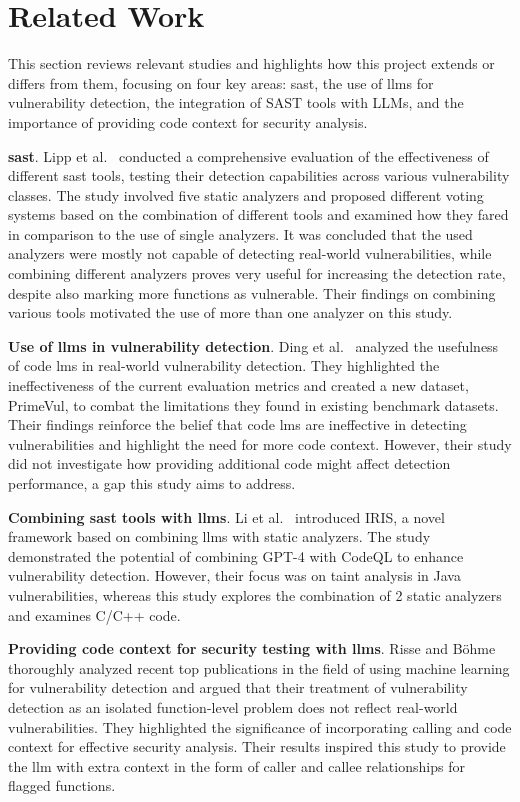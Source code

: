 \section{Related Work}
\label{sec:relwork}
This section reviews relevant studies and highlights how this project extends or differs from them, focusing on four key areas: \acl{sast}, the use of \acp{llm} for vulnerability detection, the integration of SAST tools with LLMs, and the importance of providing code context for security analysis.

\textbf{\Acl{sast}}. 
Lipp et al.~\cite{10.1145/3533767.3534380} conducted a comprehensive evaluation of the effectiveness of different \ac{sast} tools, testing their detection capabilities across various vulnerability classes. 
The study involved five static analyzers and proposed different voting systems based on the combination of different tools and examined how they fared in comparison to the use of single analyzers. 
It was concluded that the used analyzers were mostly not capable of detecting real-world vulnerabilities, while combining different analyzers proves very useful for increasing the detection rate, despite also marking more functions as vulnerable. 
Their findings on combining various tools motivated the use of more than one analyzer on this study.

\textbf{Use of \acp{llm} in vulnerability detection}. 
Ding et al.~\cite{ding2024vulnerabilitydetectioncodelanguage} analyzed the usefulness of code \acp{lm} in real-world vulnerability detection. 
They highlighted the ineffectiveness of the current evaluation metrics and created a new dataset, PrimeVul, to combat the limitations they found in existing benchmark datasets. 
Their findings reinforce the belief that code \acp{lm} are ineffective in detecting vulnerabilities and highlight the need for more code context.
However, their study did not investigate how providing additional code might affect detection performance, a gap this study aims to address.

\textbf{Combining \ac{sast} tools with \acp{llm}}.
Li et al.~\cite{li2024llmassistedstaticanalysisdetecting} introduced IRIS, a novel framework based on combining \acp{llm} with static analyzers. The study demonstrated the potential of combining GPT-4 with CodeQL to enhance vulnerability detection. However, their focus was on taint analysis in Java vulnerabilities, whereas this study explores the combination of 2 static analyzers and examines C/C++ code.

\textbf{Providing code context for security testing with \acp{llm}}.
Risse and Böhme~\cite{risse2024scorewrongexambenchmarking} thoroughly analyzed recent top publications in the field of using machine learning for vulnerability detection and argued that their treatment of vulnerability detection as an isolated function-level problem does not reflect real-world vulnerabilities. They highlighted the significance of incorporating calling and code context for effective security analysis. Their results inspired this study to provide the \ac{llm} with extra context in the form of caller and callee relationships for flagged functions.

